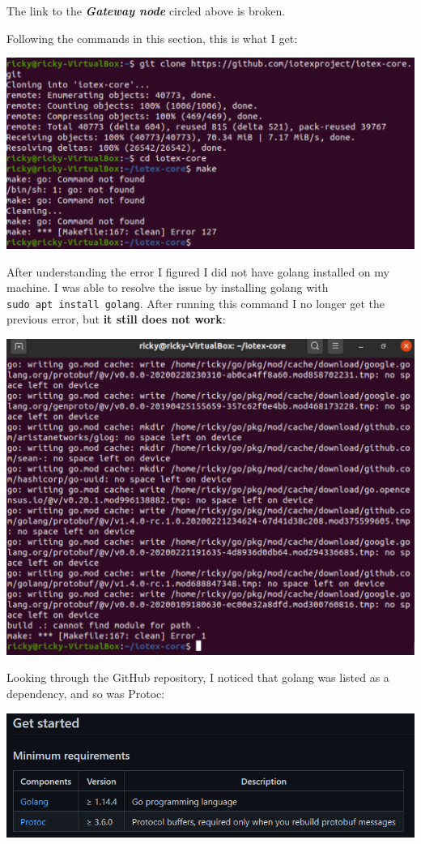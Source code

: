 \documentclass[
]{book}
\begin{document}
The link to the \textbf{\emph{Gateway node}} circled above is broken.

Following the commands in this section, this is what I get:

\includegraphics{images/testnet_git_problem.PNG}

After understanding the error I figured I did not have golang installed
on my machine. I was able to resolve the issue by installing golang with
\texttt{sudo\ apt\ install\ golang}. After running this command I no
longer get the previous error, but \textbf{it still does not work}:

\includegraphics{images/make_error.PNG}

Looking through the GitHub repository, I noticed that golang was listed
as a dependency, and so was Protoc:

\includegraphics{images/requirements.PNG}
\end{document}

